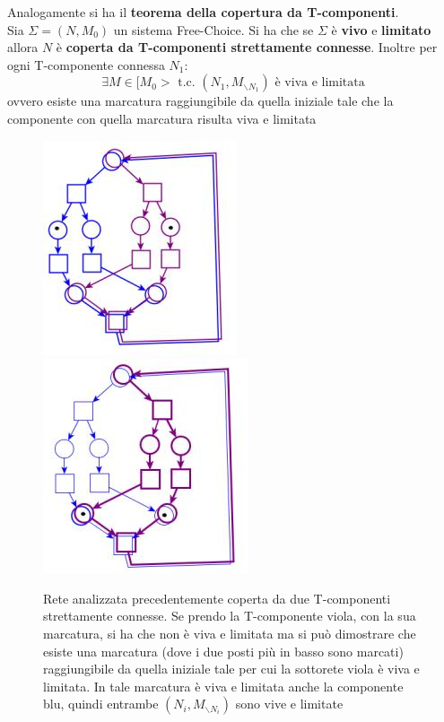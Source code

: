 \documentclass[a4paper,12pt, oneside]{book}
\begin{document}
\begin{teorema}
  Analogamente si ha il \textbf{teorema della copertura da T-componenti}.\\
  Sia $\Sigma=(N,M_0)$ un sistema Free-Choice. Si ha che se $\Sigma$
  è \textbf{vivo} e \textbf{limitato} allora $N$ è \textbf{coperta da
    T-componenti strettamente connesse}. Inoltre per ogni T-componente connessa
  $N_1$: 
  \[\exists M\in [M_0> \mbox{ t.c. } (N_1,M_{\backslash N_1})\mbox{ è viva e
      limitata}\]
  ovvero esiste una marcatura raggiungibile da quella iniziale tale che la
  componente con quella marcatura risulta viva e limitata
  \begin{figure}[H]
    \centering
    \includegraphics[scale = 0.4]{img/fc15.jpg}
    \includegraphics[scale = 0.4]{img/fc16.jpg}
    \caption{Rete analizzata precedentemente coperta da due T-componenti
      strettamente connesse. Se prendo la T-componente viola, con la sua
      marcatura, si ha che non è viva e limitata ma si può dimostrare che esiste
      una marcatura (dove i due posti più in basso sono marcati) raggiungibile
      da quella iniziale tale per cui la sottorete viola è viva e limitata. In
      tale marcatura è viva e limitata anche la componente blu, quindi entrambe
      $(N_i,M_{\backslash N_i})$ sono vive e limitate}    
  \end{figure}
\end{teorema}
\end{document}
